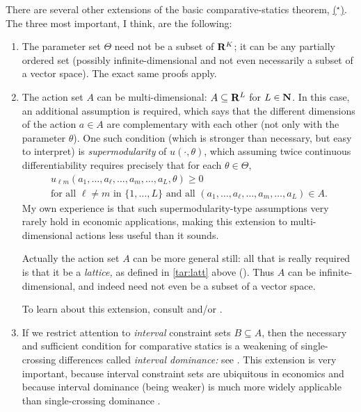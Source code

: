 There are several other extensions of the basic comparative-statics theorem, \hyperref[theorem:topkis_ms_converse]{($^\star$)}. The three most important, I think, are the following:

\begin{enumerate}

	\item The parameter set $\Theta$ need not be a subset of $\mathbf{R}^K$; it can be any partially ordered set (possibly infinite-dimensional and not even necessarily a subset of a vector space). The exact same proofs apply.

	\item The action set $A$ can be multi-dimensional: $A \subseteq \mathbf{R}^L$ for $L \in \mathbf{N}$. In this case, an additional assumption is required, which says that the different dimensions of the action $a \in A$ are complementary with each other (not only with the parameter $\theta$). One such condition (which is stronger than necessary, but easy to interpret) is \emph{supermodularity} of $u(\cdot,\theta)$, which assuming twice continuous differentiability requires precisely that for each $\theta \in \Theta$,
	\begin{multline*}
		u_{\ell m}(a_1,\dots,a_\ell,\dots,a_m,\dots,a_L,\theta) \geq 0
		\\
		\text{for all $\ell \neq m$ in $\{1,\dots,L\}$ and all $(a_1,\dots,a_\ell,\dots,a_m,\dots,a_L) \in A$.}
	\end{multline*}
	My own experience is that such supermodularity-type assumptions very rarely hold in economic applications, making this extension to multi-dimensional actions less useful than it sounds.

	Actually the action set $A$ can be more general still: all that is really required is that it be a \emph{lattice,} as defined in \cref{tar:latt} above (). Thus $A$ can be infinite-dimensional, and indeed need not even be a subset of a vector space.

	To learn about this extension, consult \textcite[sections~1.3 and 2.2]{Sarver2023} and/or \textcite{MilgromShannon1994}.

	\item If we restrict attention to \emph{interval} constraint sets $B \subseteq A$, then the necessary and sufficient condition for comparative statics is a weakening of single-crossing differences called \emph{interval dominance:} see \textcite{QuahStrulovici2009}. This extension is very important, because interval constraint sets are ubiquitous in economics and because interval dominance (being weaker) is much more widely applicable than single-crossing dominance \parencite[see e.g.][]{QuahStrulovici2013,SmithSorensenTian2021,Tian2022,Valenzuelastookey2022,csp}.


\end{enumerate}



